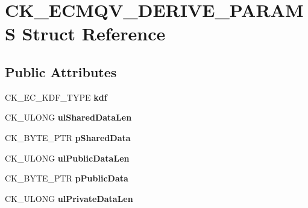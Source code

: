 \hypertarget{struct_c_k___e_c_m_q_v___d_e_r_i_v_e___p_a_r_a_m_s}{}\section{C\+K\+\_\+\+E\+C\+M\+Q\+V\+\_\+\+D\+E\+R\+I\+V\+E\+\_\+\+P\+A\+R\+A\+MS Struct Reference}
\label{struct_c_k___e_c_m_q_v___d_e_r_i_v_e___p_a_r_a_m_s}
\subsection*{Public Attributes}
\begin{DoxyCompactItemize}
\item 
\mbox{\label{struct_c_k___e_c_m_q_v___d_e_r_i_v_e___p_a_r_a_m_s_a6523ea90581ae79210ee33ae76c4d400}} 
C\+K\+\_\+\+E\+C\+\_\+\+K\+D\+F\+\_\+\+T\+Y\+PE {\bfseries kdf}
\item 
\mbox{\label{struct_c_k___e_c_m_q_v___d_e_r_i_v_e___p_a_r_a_m_s_a4f8f542bd44043a05653f0f6c8b66a6d}} 
C\+K\+\_\+\+U\+L\+O\+NG {\bfseries ul\+Shared\+Data\+Len}
\item 
\mbox{\label{struct_c_k___e_c_m_q_v___d_e_r_i_v_e___p_a_r_a_m_s_a9db74537f49450c787fb570c7ead5834}} 
C\+K\+\_\+\+B\+Y\+T\+E\+\_\+\+P\+TR {\bfseries p\+Shared\+Data}
\item 
\mbox{\label{struct_c_k___e_c_m_q_v___d_e_r_i_v_e___p_a_r_a_m_s_a54d61278e6b0fb56b068e2473e716757}} 
C\+K\+\_\+\+U\+L\+O\+NG {\bfseries ul\+Public\+Data\+Len}
\item 
\mbox{\label{struct_c_k___e_c_m_q_v___d_e_r_i_v_e___p_a_r_a_m_s_a6043a95e6203942d453f2a94bb88a416}} 
C\+K\+\_\+\+B\+Y\+T\+E\+\_\+\+P\+TR {\bfseries p\+Public\+Data}
\item 
\mbox{\label{struct_c_k___e_c_m_q_v___d_e_r_i_v_e___p_a_r_a_m_s_ab97c5df4ea59baf62d982a16b7e0869e}} 
C\+K\+\_\+\+U\+L\+O\+NG {\bfseries ul\+Private\+Data\+Len}

\end{DoxyCompactItemize}
